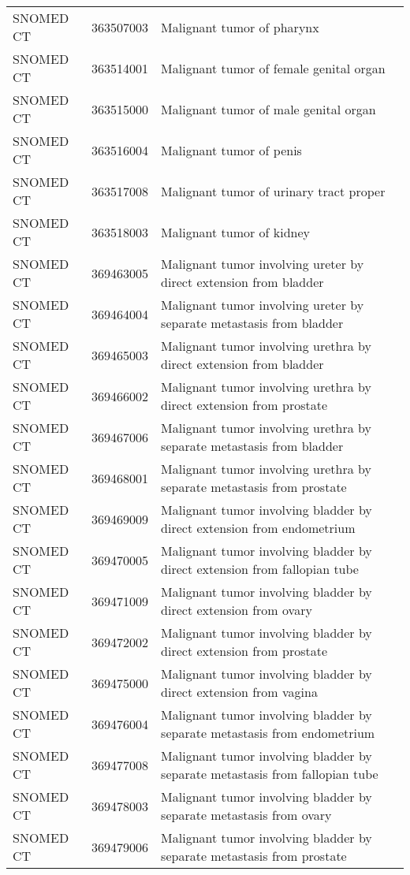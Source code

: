 \begin{longtable}{p{}p{}p{}}
  SNOMED CT & 363507003 & Malignant tumor of pharynx \\ 
  SNOMED CT & 363514001 & Malignant tumor of female genital organ \\ 
  SNOMED CT & 363515000 & Malignant tumor of male genital organ \\ 
  SNOMED CT & 363516004 & Malignant tumor of penis \\ 
  SNOMED CT & 363517008 & Malignant tumor of urinary tract proper \\ 
  SNOMED CT & 363518003 & Malignant tumor of kidney \\ 
  SNOMED CT & 369463005 & Malignant tumor involving ureter by direct extension from bladder \\ 
  SNOMED CT & 369464004 & Malignant tumor involving ureter by separate metastasis from bladder \\ 
  SNOMED CT & 369465003 & Malignant tumor involving urethra by direct extension from bladder \\ 
  SNOMED CT & 369466002 & Malignant tumor involving urethra by direct extension from prostate \\ 
  SNOMED CT & 369467006 & Malignant tumor involving urethra by separate metastasis from bladder \\ 
  SNOMED CT & 369468001 & Malignant tumor involving urethra by separate metastasis from prostate \\ 
  SNOMED CT & 369469009 & Malignant tumor involving bladder by direct extension from endometrium \\ 
  SNOMED CT & 369470005 & Malignant tumor involving bladder by direct extension from fallopian tube \\ 
  SNOMED CT & 369471009 & Malignant tumor involving bladder by direct extension from ovary \\ 
  SNOMED CT & 369472002 & Malignant tumor involving bladder by direct extension from prostate \\ 
  SNOMED CT & 369475000 & Malignant tumor involving bladder by direct extension from vagina \\ 
  SNOMED CT & 369476004 & Malignant tumor involving bladder by separate metastasis from endometrium \\ 
  SNOMED CT & 369477008 & Malignant tumor involving bladder by separate metastasis from fallopian tube \\ 
  SNOMED CT & 369478003 & Malignant tumor involving bladder by separate metastasis from ovary \\ 
  SNOMED CT & 369479006 & Malignant tumor involving bladder by separate metastasis from prostate \\ 

\end{longtable}
